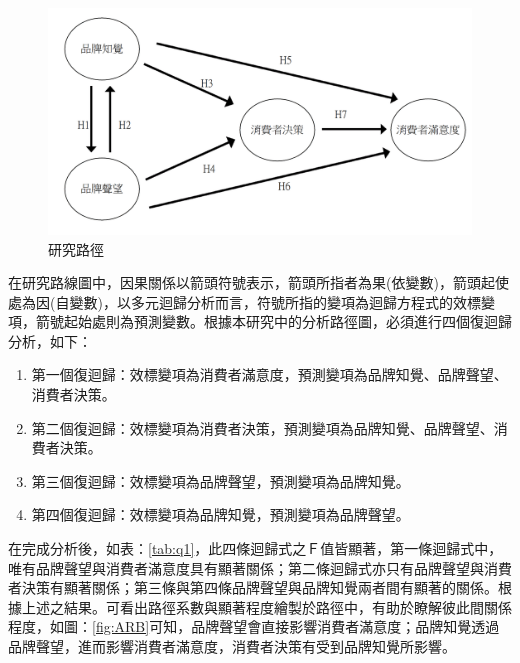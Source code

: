 \begin{figure}[h]
\centering
\includegraphics[width=14cm]{images/論文架構.png}
\caption{研究路徑}
\label{fig:ARC}
\end{figure}

在研究路線圖中，因果關係以箭頭符號表示，箭頭所指者為果(依變數)，箭頭起使處為因(自變數)，以多元迴歸分析而言，符號所指的變項為迴歸方程式的效標變項，箭號起始處則為預測變數。根據本研究中的分析路徑圖，必須進行四個復迴歸分析，如下：

\begin{enumerate}
\item 第一個復迴歸：效標變項為消費者滿意度，預測變項為品牌知覺、品牌聲望、消費者決策。
\item 第二個復迴歸：效標變項為消費者決策，預測變項為品牌知覺、品牌聲望、消費者決策。
\item 第三個復迴歸：效標變項為品牌聲望，預測變項為品牌知覺。
\item 第四個復迴歸：效標變項為品牌知覺，預測變項為品牌聲望。
\end{enumerate}

在完成分析後，如表：\ref{tab:q1}，此四條迴歸式之Ｆ值皆顯著，第一條迴歸式中，唯有品牌聲望與消費者滿意度具有顯著關係；第二條迴歸式亦只有品牌聲望與消費者決策有顯著關係；第三條與第四條品牌聲望與品牌知覺兩者間有顯著的關係。根據上述之結果。可看出路徑系數與顯著程度繪製於路徑中，有助於瞭解彼此間關係程度，如圖：\ref{fig:ARB}可知，品牌聲望會直接影響消費者滿意度；品牌知覺透過品牌聲望，進而影響消費者滿意度，消費者決策有受到品牌知覺所影響。





